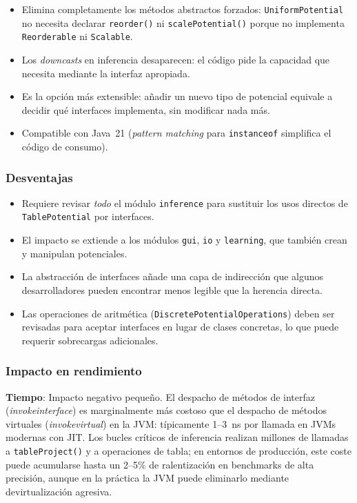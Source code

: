 \documentclass[11pt,a4paper]{article}
\newcommand{\code}[1]{\texttt{#1}}
\begin{document}
\begin{itemize}
  \item Elimina completamente los métodos abstractos forzados: \code{UniformPotential}
        no necesita declarar \code{reorder()} ni \code{scalePotential()} porque no
        implementa \code{Reorderable} ni \code{Scalable}.
  \item Los \emph{downcasts} en inferencia desaparecen: el código pide la
        capacidad que necesita mediante la interfaz apropiada.
  \item Es la opción más extensible: añadir un nuevo tipo de potencial
        equivale a decidir qué interfaces implementa, sin modificar nada más.
  \item Compatible con Java~21 (\emph{pattern matching} para \code{instanceof}
        simplifica el código de consumo).
\end{itemize}

\subsubsection*{Desventajas}

\begin{itemize}
  \item Requiere revisar \emph{todo} el módulo \code{inference} para sustituir
        los usos directos de \code{TablePotential} por interfaces.
  \item El impacto se extiende a los módulos \code{gui}, \code{io} y \code{learning},
        que también crean y manipulan potenciales.
  \item La abstracción de interfaces añade una capa de indirección que
        algunos desarrolladores pueden encontrar menos legible que la herencia
        directa.
  \item Las operaciones de aritmética (\code{DiscretePotentialOperations}) deben
        ser revisadas para aceptar interfaces en lugar de clases concretas, lo
        que puede requerir sobrecargas adicionales.
\end{itemize}

\subsubsection*{Impacto en rendimiento}

\textbf{Tiempo}: Impacto negativo pequeño.  El despacho de métodos de interfaz
(\emph{invokeinterface}) es marginalmente más costoso que el despacho de métodos
virtuales (\emph{invokevirtual}) en la JVM: típicamente 1--3~ns por llamada en JVMs
modernas con JIT.  Los bucles críticos de inferencia realizan millones de llamadas
a \code{tableProject()} y a operaciones de tabla; en entornos de producción, este
coste puede acumularse hasta un 2--5\% de ralentización en benchmarks de alta
precisión, aunque en la práctica la JVM puede eliminarlo mediante
devirtualización agresiva.
\end{document}
